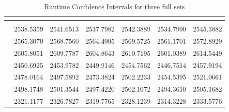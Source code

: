 \begin{table}[h!]
    \begin{center}
        \begin{tabular}{|c|r|r|r|r|r|r|}
            \hline
            &  &  &  \\
            \hline
             &  &  &  &  &  &  \\
            \hline
             & 2538.5359 & 2541.6513 & 2537.7982 & 2542.3889 & 2534.7990 & 2545.3882 \\
            \hline
             & 2565.3070 & 2568.7560 & 2564.4905 & 2569.5725 & 2561.1701 & 2572.8929 \\
            \hline
             & 2605.8051 & 2609.7787 & 2604.8643 & 2610.7195 & 2601.0389 & 2614.5449 \\
            \hline
             & 2450.6925 & 2453.9782 & 2449.9146 & 2454.7562 & 2446.7514 & 2457.9194 \\
            \hline
             & 2478.0164 & 2497.5892 & 2473.3824 & 2502.2233 & 2454.5395 & 2521.0661 \\
            \hline
             & 2498.1748 & 2501.3544 & 2497.4220 & 2502.1072 & 2494.3610 & 2505.1682 \\
            \hline
             & 2321.1177 & 2326.7827 & 2319.7765 & 2328.1239 & 2314.3228 & 2333.5776 \\
            \hline
        \end{tabular}
        \caption{Runtime Confidence Intervals for three full sets}
        \label{table:ci:runtime:runs}
    \end{center}
\end{table}
